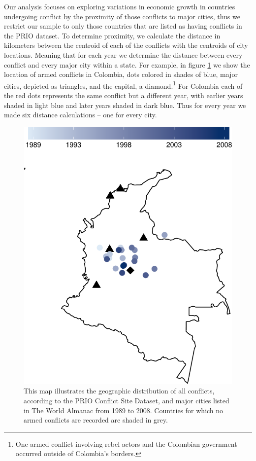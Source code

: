 Our analysis focuses on exploring variations in economic growth in countries undergoing conflict by the proximity of those conflicts to major cities, thus we restrict our sample to only those countries that are listed as having conflicts in the PRIO dataset. To determine proximity, we calculate the distance in kilometers between the centroid of each of the conflicts with the centroids of city locations. Meaning that for each year we determine the distance between every conflict and every major city within a state. For example, in figure \ref{fig:columbiaMap} we show the location of armed conflicts in Colombia, dots colored in shades of blue, major cities, depicted as triangles, and the capital, a diamond.\footnote{One armed conflict involving rebel actors and the Colombian government occurred outside of Colombia's borders.} For Colombia each of the red dots represents the same conflict but a different year, with earlier years shaded in light blue and later years shaded in dark blue. Thus for every year we made six distance calculations -- one for every city.

\begin{figure}[ht]
	\centering
	\includegraphics[width=.5\textwidth]{colombiaMap-crop}
	\caption{This map illustrates the geographic distribution of all conflicts, according to the PRIO Conflict Site Dataset, and major cities listed in The World Almanac from 1989 to 2008. Countries for which no armed conflicts are recorded are shaded in grey.}
	\label{fig:columbiaMap}
\end{figure}

